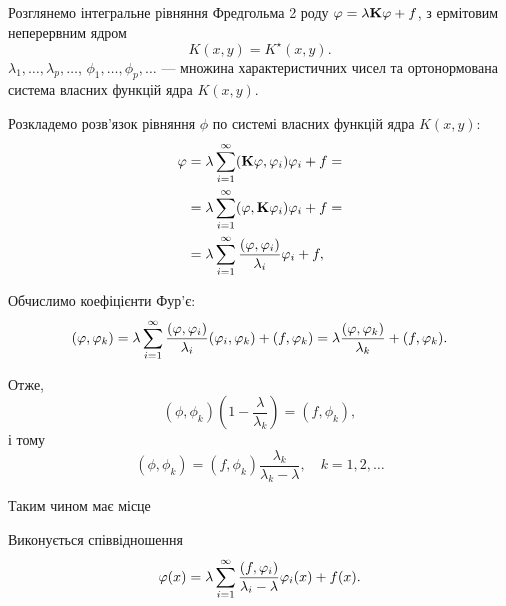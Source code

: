 Розглянемо інтегральне рівняння Фредгольма 2 роду $\phi = \lambda \bf{K} \phi + f$, з ермітовим неперервним ядром 
\begin{equation} 
	K(x, y) = K^\star  (x, y).
\end{equation}
$\lambda_1, \ldots, \lambda_p, \ldots$, $\phi_1, \ldots, \phi_p, \ldots$ --- множина характеристичних чисел та ортонормована система власних функцій ядра $K(x, y)$. \medskip

Розкладемо розв'язок рівняння $\phi$ по системі власних функцій ядра $K(x, y)$:
\begin{equation}
	\begin{aligned}
		\phi &= \lambda \Sum_{i = 1}^\infty (\bf{K}\phi, \phi_i) \phi_i + f = \\
		&= \lambda \Sum_{i = 1}^\infty (\phi, \bf{K} \phi_i) \phi_i + f = \\
		&= \lambda \Sum_{i = 1}^\infty \dfrac{(\phi, \phi_i)}{\lambda_i} \phi_i + f,
	\end{aligned}
\end{equation}

Обчислимо коефіцієнти Фур'є:
\begin{equation}
	(\phi, \phi_k) = \lambda \Sum_{i = 1}^\infty \dfrac{(\phi, \phi_i)}{\lambda_i} (\phi_i, \phi_k) + (f, \phi_k) = \lambda \dfrac{(\phi, \phi_k)}{\lambda_k} + (f, \phi_k).
\end{equation}

Отже,
\begin{equation}
	(\phi, \phi_k) \left(1 - \frac{\lambda}{\lambda_k}\right) = (f, \phi_k),
\end{equation}
і тому
\begin{equation}
	(\phi, \phi_k) = (f, \phi_k) \frac{\lambda_k}{\lambda_k - \lambda}, \quad k = 1, 2, \ldots
\end{equation}

Таким чином має місце 
\begin{theorem}
	Виконується співвідношення
	\begin{equation}
		\phi(x) = \lambda \Sum_{i = 1}^\infty \dfrac{(f, \phi_i)}{\lambda_i - \lambda} \phi_i(x) + f(x).
	\end{equation}
\end{theorem}

